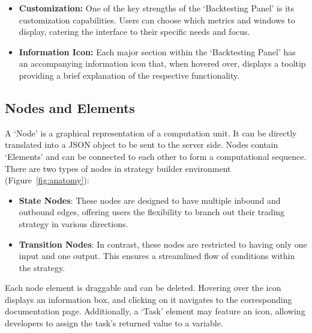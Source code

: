 \begin{itemize}
\begin{itemize}
    \item The Equity Curve can be zoomed in and out, and specific data points can be hovered over to see precise equity values.
    
    \item Trade Logs offer sorting and filtering options to quickly locate specific trades or to view them according to different criteria.
  \end{itemize}
  \item \textbf{Customization:} One of the key strengths of the `Backtesting Panel' is its customization capabilities. Users can choose which metrics and windows to display, catering the interface to their specific needs and focus.
  \item \textbf{Information Icon:} Each major section within the `Backtesting Panel' has an accompanying information icon  that, when hovered over, displays a tooltip providing a brief explanation of the respective functionality.
\end{itemize}

\subsection{Nodes and Elements}

A `Node' is a graphical representation of a computation unit. It can be directly translated into a JSON object to be sent to the server side. Nodes contain `Elements' and can be connected to each other to form a computational sequence. There are two types of nodes in strategy builder environment (Figure~\ref{fig:anatomy}):

\begin{itemize}
  \item \textbf{State Nodes}: These nodes are designed to have multiple inbound and outbound edges, offering users the flexibility to branch out their trading strategy in various directions.
  \item \textbf{Transition Nodes}: In contrast, these nodes are restricted to having only one input and one output. This ensures a streamlined flow of conditions within the strategy.
\end{itemize}

Each node element is draggable and can be deleted. Hovering over the  icon displays an information box, and clicking on it navigates to the corresponding documentation page. Additionally, a `Task' element may feature an \Circled[inner ysep=0.6\baselineskip]{\scriptsize\textbf{=}} icon, allowing developers to assign the task's returned value to a variable.

